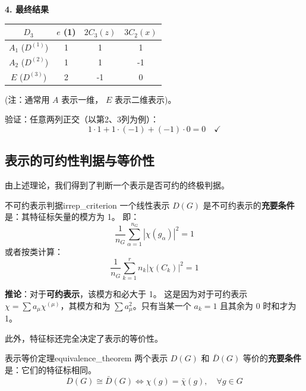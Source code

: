 \textbf{4. 最终结果}
\begin{center}
\begin{tabular}{c|ccc}
    \textbf{$D_3$} & $e$ (1) & $2C_3(z)$ & $3C_2(x)$ \\
    \hline
    $A_1$ ($D^{(1)}$) & 1 & 1 & 1 \\
    $A_2$ ($D^{(2)}$) & 1 & 1 & -1 \\
    $E$ ($D^{(3)}$) & 2 & -1 & 0 \\
\end{tabular}
\end{center}
(注：通常用 $A$ 表示一维， $E$ 表示二维表示)。

验证：任意两列正交（以第2、3列为例）：
\begin{equation}
    1\cdot 1 + 1\cdot (-1) + (-1)\cdot 0 = 0 \quad \checkmark
\end{equation}

\subsection{表示的可约性判据与等价性}

由上述理论，我们得到了判断一个表示是否可约的终极判据。

\begin{theorem}{不可约表示判据}{irrep_criterion}
    一个线性表示 $D(G)$ 是不可约表示的\textbf{充要条件}是：其特征标矢量的模方为 1。
    即：
    \begin{equation}
        \frac{1}{n_G} \sum_{\alpha=1}^{n_G} |\chi(g_\alpha)|^2 = 1
    \end{equation}
    或者按类计算：
    \begin{equation}
        \frac{1}{n_G} \sum_{k=1}^r n_k |\chi(C_k)|^2 = 1
    \end{equation}
    
    \textbf{推论}：对于\textbf{可约表示}，该模方和必大于 1。
    这是因为对于可约表示 $\chi = \sum a_\mu \chi^{(\mu)}$，其模方和为 $\sum a_\mu^2$。只有当某一个 $a_k=1$ 且其余为 0 时和才为 1。
\end{theorem}

此外，特征标还完全决定了表示的等价性。

\begin{theorem}{表示等价定理}{equivalence_theorem}
    两个表示 $D(G)$ 和 $\bar{D}(G)$ 等价的\textbf{充要条件}是：它们的特征标相同。
    \begin{equation}
        D(G) \cong \bar{D}(G) \iff \chi(g) = \bar{\chi}(g), \quad \forall g \in G
    \end{equation}
\end{theorem}

